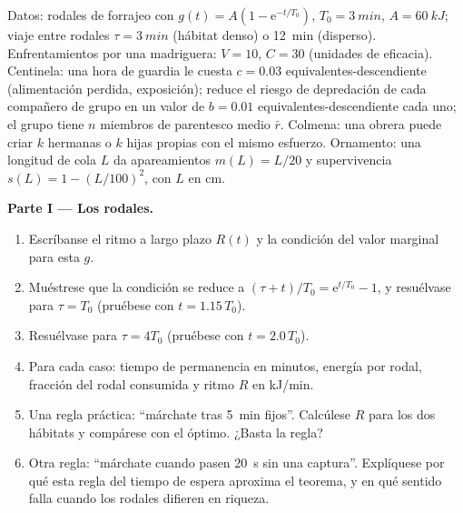 \begin{problem}
\label{pb:b3:behavioural-ecology:1}
Datos: rodales de forrajeo con $g(t) = A(1 - \mathrm{e}^{-t/T_{0}})$, $T_{0}
= \qty{3}{min}$, $A = \qty{60}{kJ}$; viaje entre rodales $\tau =
\qty{3}{min}$ (hábitat denso) o \qty{12}{min} (disperso).
Enfrentamientos por una madriguera: $V = 10$, $C = 30$ (unidades de
eficacia). Centinela: una hora de guardia le cuesta $c = 0.03$
equivalentes-descendiente (alimentación perdida, exposición); reduce el
riesgo de depredación de cada compañero de grupo en un valor de
$b = 0.01$ equivalentes-descendiente cada uno; el grupo tiene $n$
miembros de parentesco medio $\bar r$. Colmena: una obrera puede criar
$k$ hermanas o $k$ hijas propias con el mismo esfuerzo. Ornamento: una
longitud de cola $L$ da apareamientos $m(L) = L/20$ y supervivencia
$s(L) = 1 - (L/100)^{2}$, con $L$ en cm.

\medskip
\noindent\textbf{Parte I --- Los rodales.}
\begin{enumerate}
  \item Escríbanse el ritmo a largo plazo $R(t)$ y la condición del
        valor marginal para esta $g$.
  \item Muéstrese que la condición se reduce a $(\tau + t)/T_{0} = \mathrm{e}^{t/T_{0}}
        - 1$, y resuélvase para $\tau = T_{0}$ (pruébese con
        $t = 1.15\,T_{0}$).
  \item Resuélvase para $\tau = 4T_{0}$ (pruébese con $t = 2.0\,T_{0}$).
  \item Para cada caso: tiempo de permanencia en minutos, energía por
        rodal, fracción del rodal consumida y ritmo $R$ en kJ/min.
  \item Una regla práctica: ``márchate tras \qty{5}{min} fijos''.
        Calcúlese $R$ para los dos hábitats y compárese con el óptimo.
        ¿Basta la regla?
  \item Otra regla: ``márchate cuando pasen \qty{20}{s} sin una
        captura''. Explíquese por qué esta regla del tiempo de espera
        aproxima el teorema, y en qué sentido falla cuando los rodales
        difieren en riqueza.
\end{enumerate}


\end{problem}
